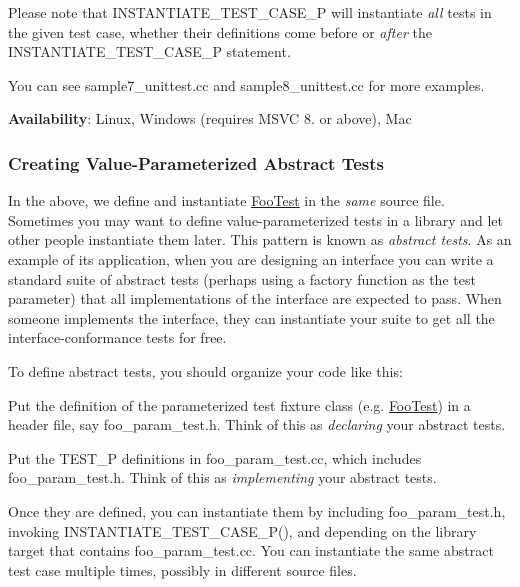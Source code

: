 Please note that {\ttfamily I\+N\+S\+T\+A\+N\+T\+I\+A\+T\+E\+\_\+\+T\+E\+S\+T\+\_\+\+C\+A\+S\+E\+\_\+P} will instantiate {\itshape all} tests in the given test case, whether their definitions come before or {\itshape after} the {\ttfamily I\+N\+S\+T\+A\+N\+T\+I\+A\+T\+E\+\_\+\+T\+E\+S\+T\+\_\+\+C\+A\+S\+E\+\_\+P} statement.

You can see sample7\+\_\+unittest.\+cc and sample8\+\_\+unittest.\+cc for more examples.

{\bfseries Availability}\+: Linux, Windows (requires M\+S\+VC 8. or above), Mac

\subsubsection*{Creating Value-\/\+Parameterized Abstract Tests}

In the above, we define and instantiate {\ttfamily \hyperlink{classFooTest}{Foo\+Test}} in the {\itshape same} source file. Sometimes you may want to define value-\/parameterized tests in a library and let other people instantiate them later. This pattern is known as {\itshape abstract tests}. As an example of its application, when you are designing an interface you can write a standard suite of abstract tests (perhaps using a factory function as the test parameter) that all implementations of the interface are expected to pass. When someone implements the interface, they can instantiate your suite to get all the interface-\/conformance tests for free.

To define abstract tests, you should organize your code like this\+:


\begin{DoxyEnumerate}
\item Put the definition of the parameterized test fixture class (e.\+g. {\ttfamily \hyperlink{classFooTest}{Foo\+Test}}) in a header file, say {\ttfamily foo\+\_\+param\+\_\+test.\+h}. Think of this as {\itshape declaring} your abstract tests.
\end{DoxyEnumerate}
\begin{DoxyEnumerate}
\item Put the {\ttfamily T\+E\+S\+T\+\_\+P} definitions in {\ttfamily foo\+\_\+param\+\_\+test.\+cc}, which includes {\ttfamily foo\+\_\+param\+\_\+test.\+h}. Think of this as {\itshape implementing} your abstract tests.
\end{DoxyEnumerate}

Once they are defined, you can instantiate them by including {\ttfamily foo\+\_\+param\+\_\+test.\+h}, invoking {\ttfamily I\+N\+S\+T\+A\+N\+T\+I\+A\+T\+E\+\_\+\+T\+E\+S\+T\+\_\+\+C\+A\+S\+E\+\_\+\+P()}, and depending on the library target that contains {\ttfamily foo\+\_\+param\+\_\+test.\+cc}. You can instantiate the same abstract test case multiple times, possibly in different source files.

